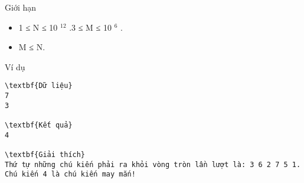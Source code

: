 Giới hạn
\begin{itemize}
	\item     1 ≤ N ≤ 10    $^     12    $    .3 ≤ M ≤ 10    $^     6    $    .   
	\item     M ≤ N.   
\end{itemize}
Ví dụ
\begin{verbatim}
\textbf{Dữ liệu}
7 
3

\textbf{Kết quả}
4

\textbf{Giải thích}
Thứ tự những chú kiến phải ra khỏi vòng tròn lần lượt là: 3 6 2 7 5 1.
Chú kiến 4 là chú kiến may mắn!
\end{verbatim}